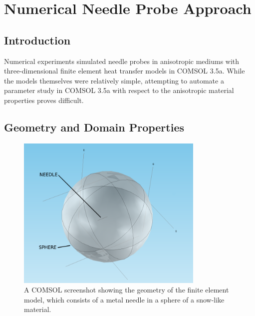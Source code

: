 \chapter{Numerical Needle Probe Approach}
\label{sec:numerical-np}
\bigskip

\section{Introduction} 
\label{sec:numerical-np:introduction}

Numerical experiments simulated needle probes in anisotropic mediums with
three-dimensional finite element heat transfer models in COMSOL 3.5a. While the
models themselves were relatively simple, attempting to automate a parameter
study in COMSOL 3.5a with respect to the anisotropic material properties proves
difficult.

\section{Geometry and Domain Properties}

\begin{figure}[h]
\centering
\includegraphics[width=0.8\textwidth]{fig/domain_2.png}
\caption{A COMSOL screenshot showing the geometry of the finite element model, which consists of a metal needle in a sphere of a snow-like material.}
\label{fig:domain}
\end{figure}


